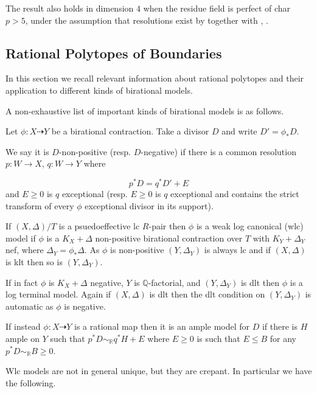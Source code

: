 The result also holds in dimension $4$ when the residue field is perfect of char $p>5$, under the assumption that resolutions exist by \cite{hacon2020relative} together with \cite[Theorem 1.1]{hacon2017rationality}, \cite[Corollary 1.3]{arvidsson2020kawamata}.


\subsection{Rational Polytopes of Boundaries}

In this section we recall relevant information about rational polytopes and their application to different kinds of birational models.

A non-exhaustive list of important kinds of birational models is as follows.

\begin{definition}\label{Model-defs}
	Let $\phi\colon X \dashrightarrow Y$ be a birational contraction. Take a divisor $D$ and write $D'=\phi_{*}D$. 
	
	We say it is $D$-non-positive (resp. $D$-negative) if there is a common resolution $p\colon W \to X$, $q\colon W \to Y$ where 
	
	\[p^{*}D=q^{*}D'+E\]
	and $E \geq 0$ is $q$ exceptional (resp. $E \geq 0$ is $q$ exceptional and contains the strict transform of every $\phi$ exceptional divisor in its support). 
	
	If $(X,\Delta)/T$ is a psuedoeffective lc $R$-pair then $\phi$ is a weak log canonical (wlc) model if $\phi$ is a $K_{X}+\Delta$ non-positive birational contraction over $T$ with $K_{Y}+\Delta_{Y}$ nef, where $\Delta_{Y}=\phi_{*}\Delta$. As $\phi$ is non-positive $(Y,\Delta_{Y})$ is always lc and if $(X,\Delta)$ is klt then so is $(Y,\Delta_{Y})$. 
	
	If in fact $\phi$ is $K_{X}+\Delta$ negative, $Y$ is $\mathbb{Q}$-factorial, and $(Y,\Delta_{Y})$ is dlt then $\phi$ is a log terminal model. Again if $(X,\Delta)$ is dlt then the dlt condition on $(Y,\Delta_{Y})$ is automatic as $\phi$ is negative.
	
	If instead $\phi\colon X \dashrightarrow Y$ is a rational map then it is an ample model for $D$ if there is $H$ ample on $Y$ such that $p^{*}D\sim_{\mathbb{R}}q^{*}H+E$ where $E \geq 0$ is such that $E \leq B$ for any $p^{*}D \sim_{\mathbb{R}} B \geq 0$.
\end{definition}

Wlc models are not in general unique, but they are crepant. In particular we have the following.

